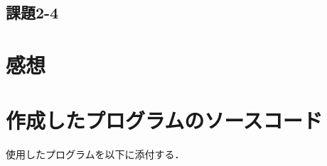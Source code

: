 \subsection{課題2-4}


\section{感想}


\section{作成したプログラムのソースコード} \label{sec:makep}

使用したプログラムを以下に添付する．


